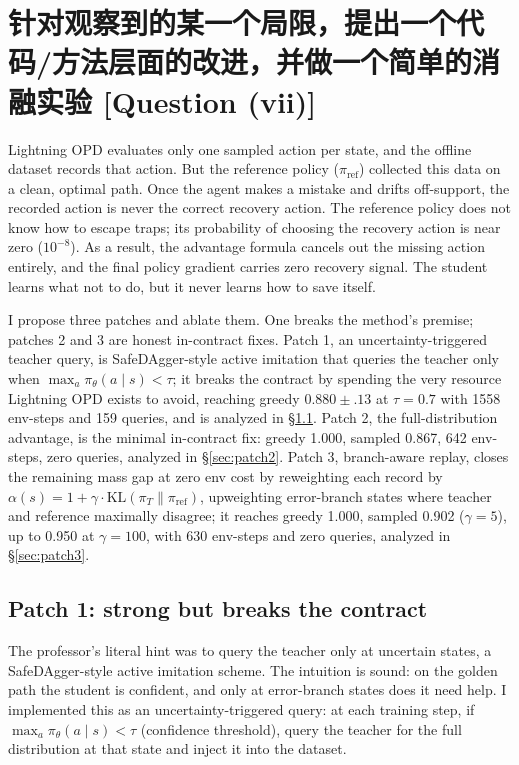 \documentclass[11pt]{article}
\newcommand{\qtag}[1]{\hfill{\normalfont\small\color{gray}[Question (#1)]}}
\begin{document}
\section{针对观察到的某一个局限，提出一个代码/方法层面的改进，并做一个简单的消融实验 \qtag{vii}}
\label{sec:patch}

Lightning OPD evaluates only one sampled action per state, and the
offline dataset records that action. But the reference policy
($\pi_{\text{ref}}$) collected this data on a clean, optimal path. Once the agent
makes a mistake and drifts off-support, the recorded action is never the correct
recovery action. The reference policy does not know how to escape traps; its
probability of choosing the recovery action is near zero ($10^{-8}$). As a result,
the advantage formula cancels out the missing action entirely, and the final policy
gradient carries zero recovery signal. The student learns what not to do, but it
never learns how to save itself.

I propose three patches and ablate them. One breaks the method's premise; patches 2
and 3 are honest in-contract fixes. Patch 1, an uncertainty-triggered teacher query,
is SafeDAgger-style active imitation that queries the teacher only when
$\max_a \pi_\theta(a\mid s) < \tau$; it breaks the contract by spending the very
resource Lightning OPD exists to avoid, reaching greedy $0.880 \pm .13$ at $\tau=0.7$
with 1558 env-steps and 159 queries, and is analyzed in \S\ref{sec:patch1-contract}.
Patch 2, the full-distribution advantage, is the minimal in-contract fix: greedy 1.000,
sampled 0.867, 642 env-steps, zero queries, analyzed in \S\ref{sec:patch2}. Patch 3,
branch-aware replay, closes the remaining mass gap at zero env cost by reweighting
each record by $\alpha(s) = 1 + \gamma\cdot\mathrm{KL}(\pi_T \| \pi_{\mathrm{ref}})$,
upweighting error-branch states where teacher and reference maximally disagree; it
reaches greedy 1.000, sampled 0.902 ($\gamma=5$), up to 0.950 at $\gamma=100$, with
630 env-steps and zero queries, analyzed in \S\ref{sec:patch3}.

\subsection{Patch 1: strong but breaks the contract}
\label{sec:patch1-contract}

The professor's literal hint was to query the teacher only at uncertain states, a
SafeDAgger-style active imitation scheme. The intuition is sound: on the golden path
the student is confident, and only at error-branch states does it need help. I
implemented this as an uncertainty-triggered query: at each training step, if
$\max_a \pi_\theta(a\mid s) < \tau$ (confidence threshold), query the teacher for the
full distribution at that state and inject it into the dataset.
\end{document}
